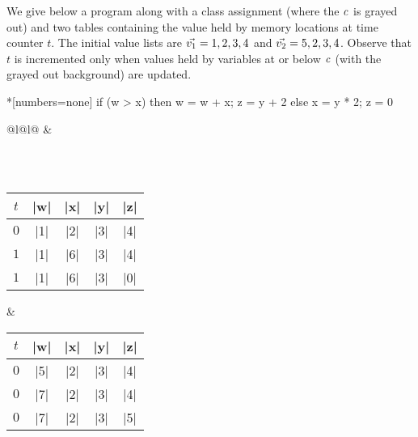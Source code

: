 We give below a program along with a class assignment (where the  \(\mathit{c}\) is grayed out) and two tables containing the
value held by memory locations at time counter \(t\). The initial
value lists are \(\vec{v_1} = \prc|1|, \prc|2|, \prc|3|, \prc|4|\)
and \(\vec{v_2} = \prc|5|, \prc|2|, \prc|3|, \prc|4|\). Observe that
\(t\) is incremented only when values held by variables at or below
\(\mathit{c}\) (with the grayed out background) are updated.

\newsavebox\ifconectwoo
\begin{lrbox}{\ifconectwoo}
\begin{minipage}{5cm}
\begin{whilelisting}*[numbers=none]
if (w > x) then
  w = w + x;
  z = y + 2
else
  x = y * 2;
  z = 0
\end{whilelisting}
\end{minipage}
\end{lrbox}

\noindent%
\begin{tabularx}{\textwidth}{@{}l@{\hspace{2em}}l@{}}
\usebox\ifconectwoo &
\begin{tikzpicture}[baseline = 30pt, anchor=base, node distance=1cm]
\node (x) {\(\lvl{\prc|x|}\)};
\node (w) [above left  = .45cm and .08cm of x] {\(\lvl{\prc|w|}\)};
\node (y) [above right = .45cm and .08cm of x] {\(\lvl{\prc|y|}\)};
\node (z) [above right = .45cm and .08cm of w] {\(\lvl{\prc|z|}\)};
\draw[->] (x) -- (w);
\draw[->] (x) -- (y);
\draw[->] (w) -- (z);
\draw[->] (y) -- (z);
\begin{scope}[on background layer]
\node [
  fill=fillcolor, fit=(y), rounded corners=.3cm,
  inner sep=1pt, draw=fillborder] {};
\end{scope}
\end{tikzpicture}
\\ \\
\begin{tabular}{c || c >{
  \columncolor{fillcolor}}c >{\columncolor{fillcolor}}c c }
$t$ & \prc|w| & \prc|x| & \prc|y| & \prc|z| \\ \hline \hline
$0$ & \prc|1| & \prc|2| & \prc|3| & \prc|4| \\ \hline
$1$ & \prc|1| & \prc|6| & \prc|3| & \prc|4| \\
$1$ & \prc|1| & \prc|6| & \prc|3| & \prc|0|
\end{tabular}
&
\begin{tabular}{c || c >{
  \columncolor{fillcolor}}c >{\columncolor{fillcolor}}c c }
$t$ & \prc|w| & \prc|x| & \prc|y| & \prc|z| \\ \hline \hline
$0$ & \prc|5| & \prc|2| & \prc|3| & \prc|4| \\ \hline
$0$ & \prc|7| & \prc|2| & \prc|3| & \prc|4| \\
$0$ & \prc|7| & \prc|2| & \prc|3| & \prc|5|
\end{tabular}
\end{tabularx}

